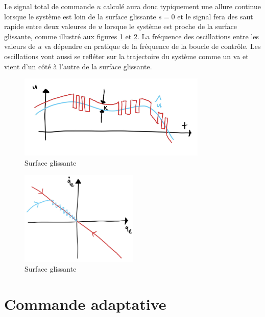 Le signal total de commande $u$ calculé aura donc typiquement une allure continue lorsque le système est loin de la surface glissante $s=0$ et le signal fera des saut rapide entre deux valeures de $u$ lorsque le système est proche de la surface glissante, comme illustré aux figures \ref{fig:slidingmode_u} et \ref{fig:slidingmode2}. La fréquence des oscillations entre les valeurs de $u$ va dépendre en pratique de la fréquence de la boucle de contrôle. Les oscillations vont aussi se refléter sur la trajectoire du système comme un va et vient d'un côté à l'autre de la surface glissante.  
\begin{figure}[htp]
	\centering
		\includegraphics[width=0.80\textwidth]{fig/slidingmode_u.jpeg}
	\caption{Surface glissante}
	\label{fig:slidingmode_u}
\end{figure}

\begin{figure}[htp]
	\centering
		\includegraphics[width=0.50\textwidth]{fig/slidingmode2.jpeg}
	\caption{Surface glissante}
	\label{fig:slidingmode2}
\end{figure}



\newpage
\section{Commande adaptative}

